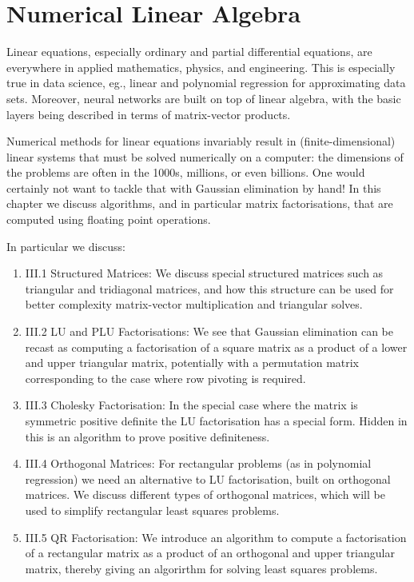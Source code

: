 \documentclass[12pt,a4paper]{book}
\theoremstyle{definition}
\begin{document}





\chapter{Numerical Linear Algebra}

Linear equations, especially ordinary and partial differential equations, are everywhere in applied mathematics, physics, and engineering.
This is especially true in data science, eg., linear and polynomial regression for approximating data sets. 
Moreover, neural networks are built on top of linear algebra, with the basic layers being described in terms of matrix-vector products.

Numerical methods for linear equations invariably result
in (finite-dimensional) linear systems that must be solved numerically on a computer:
the dimensions of the problems are often in the 1000s, millions, or even billions.
One would certainly not want to tackle that with Gaussian elimination by hand!
In this chapter we discuss algorithms, and in particular matrix factorisations, that are
computed using floating point operations. 



In particular we discuss:

\begin{enumerate}
    \item III.1 Structured Matrices: We discuss special structured matrices such as triangular and tridiagonal matrices, and how this structure can be used for better complexity matrix-vector multiplication and triangular solves.
    \item III.2 LU and PLU Factorisations: We see that Gaussian elimination can be recast as computing a factorisation of a square matrix as a product of a lower and upper triangular matrix, potentially with a permutation matrix
    corresponding to the case where row pivoting is required.
    \item III.3 Cholesky Factorisation: In the special case where the matrix is symmetric positive
    definite the LU factorisation has a special form. Hidden in this is an algorithm to prove positive definiteness.
\item III.4 Orthogonal Matrices: For rectangular problems (as in polynomial regression) we need an alternative to LU factorisation, built on orthogonal matrices.
We discuss different types of orthogonal matrices, which will be used to simplify rectangular least squares problems.
\item III.5 QR Factorisation: We introduce an algorithm to compute a factorisation of a rectangular matrix as a product of an orthogonal and upper triangular matrix, thereby giving an algorirthm for solving least squares problems.
\end{enumerate}
\end{document}
